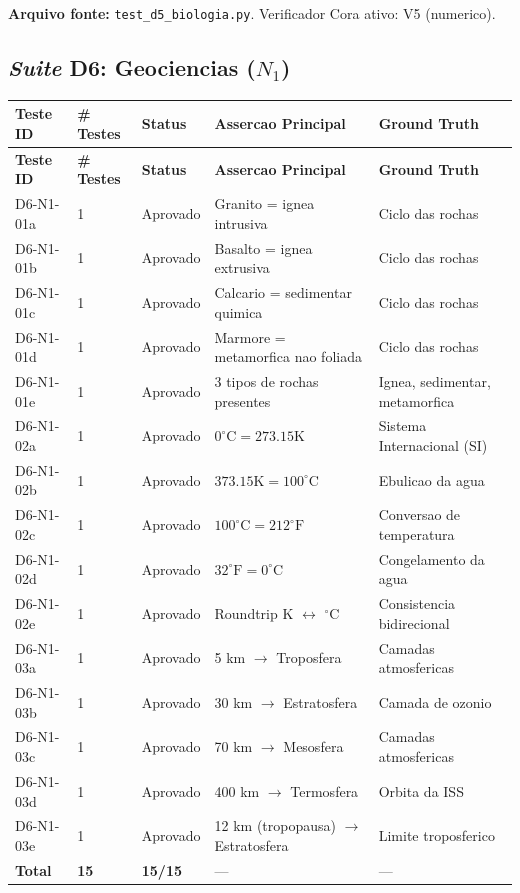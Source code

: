 \textbf{Arquivo fonte:} \texttt{test\_d5\_biologia.py}. Verificador Cora ativo: V5 (numerico).

\subsection{\textit{Suite} D6: Geociencias ($N_1$)}

\begin{longtable}{|p{2.5cm}|p{2.0cm}|p{2.0cm}|p{3.5cm}|p{3.5cm}|}
\hline
\textbf{Teste ID} & \textbf{\# Testes} & \textbf{Status} & \textbf{Assercao Principal} & \textbf{Ground Truth} \\
\hline
\endfirsthead
\hline
\textbf{Teste ID} & \textbf{\# Testes} & \textbf{Status} & \textbf{Assercao Principal} & \textbf{Ground Truth} \\
\hline
\endhead
\hline
\endfoot
D6-N1-01a & 1 & Aprovado & Granito = ignea intrusiva & Ciclo das rochas \\
\hline
D6-N1-01b & 1 & Aprovado & Basalto = ignea extrusiva & Ciclo das rochas \\
\hline
D6-N1-01c & 1 & Aprovado & Calcario = sedimentar quimica & Ciclo das rochas \\
\hline
D6-N1-01d & 1 & Aprovado & Marmore = metamorfica nao foliada & Ciclo das rochas \\
\hline
D6-N1-01e & 1 & Aprovado & 3 tipos de rochas presentes & Ignea, sedimentar, metamorfica \\
\hline
D6-N1-02a & 1 & Aprovado & $0^{\circ}\text{C}=273.15\text{K}$ & Sistema Internacional (SI) \\
\hline
D6-N1-02b & 1 & Aprovado & $373.15\text{K}=100^{\circ}\text{C}$ & Ebulicao da agua \\
\hline
D6-N1-02c & 1 & Aprovado & $100^{\circ}\text{C}=212^{\circ}\text{F}$ & Conversao de temperatura \\
\hline
D6-N1-02d & 1 & Aprovado & $32^{\circ}\text{F}=0^{\circ}\text{C}$ & Congelamento da agua \\
\hline
D6-N1-02e & 1 & Aprovado & Roundtrip K $\leftrightarrow$ $^{\circ}$C & Consistencia bidirecional \\
\hline
D6-N1-03a & 1 & Aprovado & 5 km $\rightarrow$ Troposfera & Camadas atmosfericas \\
\hline
D6-N1-03b & 1 & Aprovado & 30 km $\rightarrow$ Estratosfera & Camada de ozonio \\
\hline
D6-N1-03c & 1 & Aprovado & 70 km $\rightarrow$ Mesosfera & Camadas atmosfericas \\
\hline
D6-N1-03d & 1 & Aprovado & 400 km $\rightarrow$ Termosfera & Orbita da ISS \\
\hline
D6-N1-03e & 1 & Aprovado & 12 km (tropopausa) $\rightarrow$ Estratosfera & Limite troposferico \\
\hline
\textbf{Total} & \textbf{15} & \textbf{15/15} & --- & --- \\
\hline
\end{longtable}

